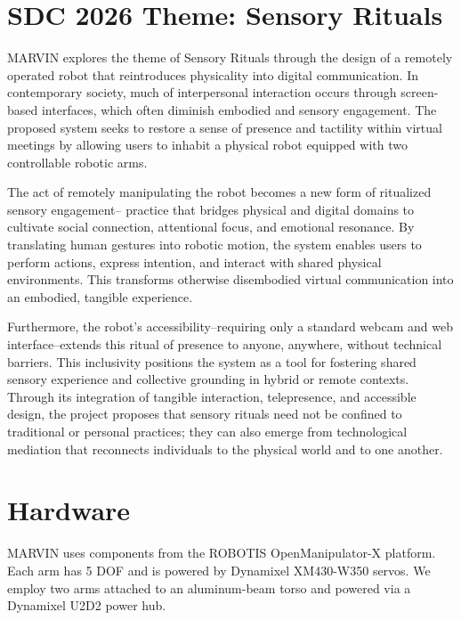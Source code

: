\documentclass[sigconf]{acmart}
\begin{document}
\section{SDC 2026 Theme: Sensory Rituals}
MARVIN explores the theme of Sensory Rituals through the design of a remotely operated robot that reintroduces physicality into digital communication. In contemporary society, much of interpersonal interaction occurs through screen-based interfaces, which often diminish embodied and sensory engagement. The proposed system seeks to restore a sense of presence and tactility within virtual meetings by allowing users to inhabit a physical robot equipped with two controllable robotic arms.

The act of remotely manipulating the robot becomes a new form of ritualized sensory engagement-- practice that bridges physical and digital domains to cultivate social connection, attentional focus, and emotional resonance. By translating human gestures into robotic motion, the system enables users to perform actions, express intention, and interact with shared physical environments. This transforms otherwise disembodied virtual communication into an embodied, tangible experience.

Furthermore, the robot’s accessibility--requiring only a standard webcam and web interface--extends this ritual of presence to anyone, anywhere, without technical barriers. This inclusivity positions the system as a tool for fostering shared sensory experience and collective grounding in hybrid or remote contexts. Through its integration of tangible interaction, telepresence, and accessible design, the project proposes that sensory rituals need not be confined to traditional or personal practices; they can also emerge from technological mediation that reconnects individuals to the physical world and to one another.


\section{Hardware}
MARVIN uses components from the ROBOTIS OpenManipulator-X platform. Each arm has 5 DOF and is powered by Dynamixel XM430-W350 servos. We employ two arms attached to an aluminum-beam torso and powered via a Dynamixel U2D2 power hub.
\end{document}
